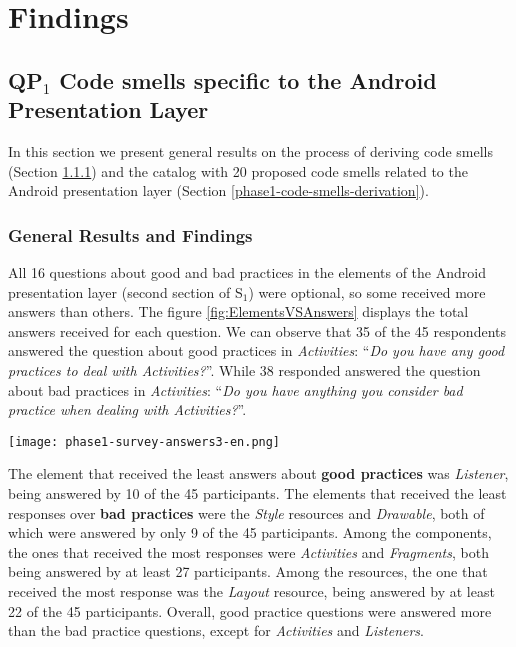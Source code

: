 \section{Findings}

\subsection{QP$_1$ Code smells specific to the Android Presentation Layer}
\label{phase1-results}

In this section we present general results on the process of deriving code smells (Section \ref{phase1-general-results}) and the catalog with 20 proposed code smells related to the Android presentation layer (Section \ref{phase1-code-smells-derivation}).

\subsubsection{General Results and Findings}
\label{phase1-general-results}

All 16 questions about good and bad practices in the elements of the Android presentation layer (second section of S$_1$) were optional, so some received more answers than others. The figure \ref{fig:ElementsVSAnswers} displays the total answers received for each question. We can observe that 35 of the 45 respondents answered the question about good practices in \textit{Activities}: ``\textit{Do you have any good practices to deal with Activities?}''. While 38 responded answered the question about bad practices in \textit{Activities}: ``\textit{Do you have anything you consider bad practice when dealing with Activities?}''.

\begin{figure*}[!htb]
\centering
\texttt{[image: phase1-survey-answers3-en.png]}
\caption{Total answers for each question about good and bad practices in the eight elements of the Android presentation layer.}
\label{fig:ElementsVSAnswers}
\end{figure*}

The element that received the least answers about \textbf{\small good practices} was \textit{Listener}, being answered by 10 of the 45 participants. The elements that received the least responses over \textbf{\small bad practices} were the \textit{Style} resources and \textit{Drawable}, both of which were answered by only 9 of the 45 participants. Among the components, the ones that received the most responses were \textit{Activities} and \textit{Fragments}, both being answered by at least 27 participants. Among the resources, the one that received the most response was the \textit{Layout} resource, being answered by at least 22 of the 45 participants. Overall, good practice questions were answered more than the bad practice questions, except for \textit{Activities} and \textit{Listeners}.

